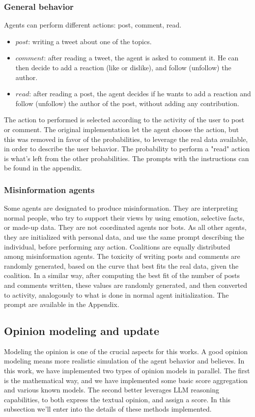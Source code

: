 \subsubsection{General behavior}
Agents can perform different actions: post, comment, read.
\begin{itemize}
    \item $post$: writing a tweet about one of the topics.
    \item $comment$: after reading a tweet, the agent is asked to comment it. He can then decide to add a reaction (like or dislike), and follow (unfollow) the author.
    \item $read$: after reading a post, the agent decides if he wants to add a reaction and follow (unfollow) the author of the post, without adding any contribution.
\end{itemize}

The action to performed is selected according to the activity of the user to post or comment. 
The original implementation let the agent choose the action, but this was removed in favor of the probabilities, to leverage the real data available, in order to describe the user behavior.
The probability to perform a "read" action is what's left from the other probabilities.
The prompts with the instructions can be found in the appendix.


\subsubsection{Misinformation agents}
Some agents are designated to produce misinformation. They are interpreting normal people, who try to support their views by using emotion, selective facts, or made-up data. They are not coordinated agents nor bots.
As all other agents, they are initialized with personal data, and use the same prompt describing the individual, before performing any action.
Coalitions are equally distributed among misinformation agents.
The toxicity of writing posts and comments are randomly generated, based on the curve that best fits the real data, given the coalition.
In a similar way, after computing the best fit of the number of posts and comments written, these values are randomly generated, and then converted to activity, analogously to what is done in normal agent initialization.
The prompt are available in the Appendix.

\subsection{Opinion modeling and update}
Modeling the opinion is one of the crucial aspects for this works. A good opinion modeling means more realistic simulation of the agent behavior and believes.
In this work, we have implemented two types of opinion models in parallel. The first is the mathematical way, and we have implemented some basic score aggregation and various known models. The second better leverages LLM reasoning capabilities, to both express the textual opinion, and assign a score. 
In this subsection we'll enter into the details of these methods implemented.


